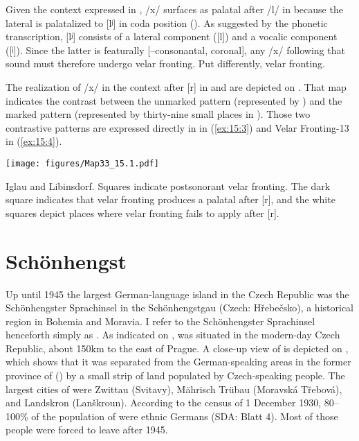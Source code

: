 {Given the context expressed in , /x/ surfaces as palatal after /l/ in  because the lateral is palatalized to [lʲ] in coda position (). As suggested by the phonetic transcription, [lʲ] consists of a lateral component ([l]) and a vocalic component ([ʲ]). Since the latter is featurally [--consonantal, coronal], any /x/ following that sound must therefore undergo velar fronting. Put differently,   velar fronting.

The realization of /x/ in the context after [r] in  and  are depicted on . That map indicates the contrast between the unmarked pattern (represented by ) and the marked pattern (represented by thirty-nine small places in ). Those two contrastive patterns are expressed directly in  in (\ref{ex:15:3}) and Velar  Fronting-13 in (\ref{ex:15:4}).

\begin{map}
\texttt{[image: figures/Map33\_15.1.pdf]}
\caption[{Iglau} and {Libinsdorf}]{{Iglau} and {Libinsdorf}. Squares indicate postsonorant velar fronting. The dark square \citep{Weinelt1940} indicates that velar fronting produces a palatal after [r], and the white squares \citep{Stolle1969} depict places where velar fronting fails to apply after [r].}
\label{map:33}
\end{map}

\section{Schönhengst}\label{sec:15.3}\largerpage

Up until 1945 the largest German-language island in the Czech Republic was the Schönhengster Sprachinsel in the Schönhengstgau (Czech: Hřebečsko), a historical region in Bohemia and Moravia. I refer to the Schönhengster Sprachinsel  henceforth simply as . As indicated on ,  was situated in the modern-day Czech Republic, about 150km to the east of Prague. A close-up view of  is depicted on , which shows that it was separated from the German-speaking areas in the former province of  () by a small strip of land populated by Czech-speaking people. The largest cities of  were Zwittau (Svitavy), Mährisch Trübau (Moravská Třebová), and Landskron (Lanškroun). According to the census of 1 December 1930, 80--100\% of the population of  were ethnic Germans (SDA: Blatt 4). Most of those people were forced to leave  after 1945.


}
